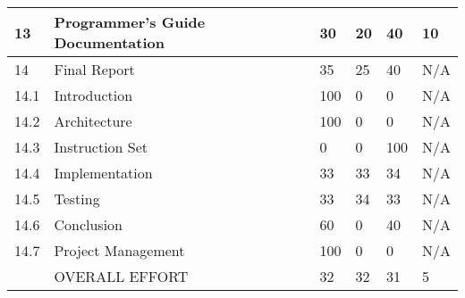 \begin{table}[!h]
\begin{tabular}{p{0.8cm}p{\textwidth-10.2cm}p{1.7cm}p{1.7cm}p{1.7cm}p{1.7cm}}
13   & Programmer's Guide Documentation			& 30	& 20	& 40 	& 10 \\ \hline 
14    & Final Report					& 35	& 25	& 40 	& N/A \\  
14.1  & Introduction 					& 100	& 0	& 0 	& N/A \\  
14.2  & Architecture 					& 100	& 0	& 0 	& N/A \\  
14.3  & Instruction Set 				& 0	& 0	& 100 	& N/A \\  
14.4  & Implementation 					& 33	& 33	& 34 	& N/A \\  
14.5  & Testing 					& 33	& 34	& 33 	& N/A \\  
14.6  & Conclusion 					& 60	& 0	& 40 	& N/A \\  
14.7  & Project Management 				& 100	& 0	& 0 	& N/A \\ \hline 
      &  OVERALL EFFORT					& 32	& 32	& 31 	& 5 \\ \hline 
\end{tabular}
\end{table}
